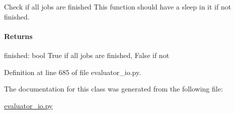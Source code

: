 Check if all jobs are finished This function should have a sleep in it if not finished. 

\paragraph*{Returns }

finished\+: bool True if all jobs are finished, False if not 

Definition at line 685 of file evaluator\+\_\+io.\+py.



The documentation for this class was generated from the following file\+:\begin{DoxyCompactItemize}
\item 
\hyperlink{evaluator__io_8py}{evaluator\+\_\+io.\+py}\end{DoxyCompactItemize}
